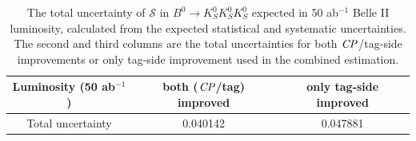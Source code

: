 \begin{table}[htpb]
	\centering
	\caption{The total uncertainty of $\mathcal{S}$ in $B^0 \to K_S^0  K_S^0  K_S^0$ expected in 50 ab$^{-1}$ Belle II luminosity, calculated from the expected statistical and systematic uncertainties. The second and third columns are the total uncertainties for both $\it{CP}$/tag-side improvements or only tag-side improvement used in the combined estimation.}
	\label{tab:err_full}
	\begin{tabular}{c| c |c}
		\hline
		Luminosity (50 ab$^{-1}$) & both ($\it{CP}$/tag) improved & only tag-side improved\\
		\hline
		Total uncertainty &  0.040142 & 0.047881 \\
		\hline
	\end{tabular}
\end{table}

